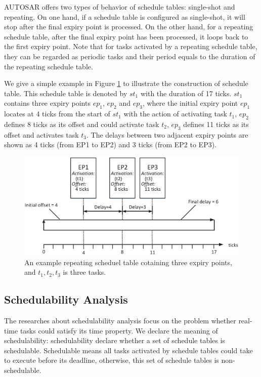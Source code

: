 \documentclass[sigconf]{acmart}
\begin{document}
AUTOSAR offers two types of behavior of schedule tables: single-shot and repeating. On one hand, if a schedule table is configured as single-shot, it will stop after the final expiry point is processed. On the other hand, for a repeating schedule table, after the final expiry point has been processed, it loops back to the first expiry point. Note that for tasks activated by a repeating schedule table, they can be regarded as periodic tasks and their period equals to the duration of the repeating schedule table.

We give a simple example in Figure \ref{figure_st1} to illustrate the construction of schedule table. This schedule table is denoted by $st_1$ with the duration of 17 ticks. $st_1$ contains three expiry points $ep_1$, $ep_2$ and $ep_3$, where the initial expiry point $ep_1$ locates at 4 ticks from the start of $st_1$ with the action of activating task $t_1$, $ep_2$ defines 8 ticks as its offset and could activate task $t_2$, $ep_3$ defines 11 ticks as its offset and activates task $t_3$. The delays between two adjacent expiry points are shown as 4 ticks (from EP1 to EP2) and 3 ticks (from EP2 to EP3).
\begin{figure}[t]
  \centering
  \includegraphics[scale=.32]{graphics/figure_st1.eps}
  \caption{An example repeating scheduel table cotaining three expiry points, and $t_1,t_2,t_3$ is three tasks.}
  \label{figure_st1}
\end{figure}
\subsection{Schedulability Analysis}
The researches about schedulability analysis focus on the problem whether real-time tasks could satisfy its time property. We declare the meaning of schedulability: schedulability declare whether a set of schedule tables is schedulable. Schedulable means all tasks activated by schedule tables could take to execute before its deadline, otherwise, this set of schedule tables is non-schedulable.
\end{document}
